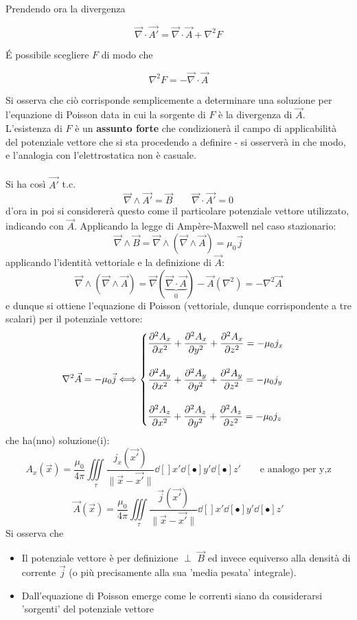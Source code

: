 Prendendo ora la divergenza

\[\vec{\nabla} \cdot \vec{A'} = \vec{\nabla} \cdot \vec{A} + \nabla^2 F\]

\'E possibile scegliere $F$ di modo che

\[\nabla^2 F = - \vec{\nabla} \cdot \vec{A}\]

Si osserva che ciò corrisponde semplicemente a determinare una soluzione per l'equazione di Poisson data in cui la sorgente di $F$ è la divergenza di $\vec{A}$. L'esistenza di $F$ è un \textbf{assunto forte} che condizionerà il campo di applicabilità del potenziale vettore che si sta procedendo a definire - si osserverà in che modo, e l'analogia con l'elettrostatica non è casuale.
\\~\\Si ha così $\vec{A'}$ t.c.
\[\vec{\nabla} \wedge \vec{A'} = \vec{B} \qquad  \vec{\nabla} \cdot \vec{A'} = 0\]
d'ora in poi si considererà questo come il particolare potenziale vettore utilizzato, indicando con $\vec{A}$. Applicando la legge di Ampère-Maxwell nel caso stazionario:
\[\vec{\nabla} \wedge \vec{B} = \vec{\nabla} \wedge (\vec{\nabla} \wedge \vec{A}) = \mu_0 \vec{j}\]
applicando l'identità vettoriale e la definizione di $\vec{A}$:
\[\vec{\nabla} \wedge (\vec{\nabla} \wedge \vec{A}) = \vec{\nabla} (\underbrace{\vec{\nabla} \cdot \vec{A}}_{0}) - \vec{A}(\nabla^2) = - \nabla^2 \vec{A}\]
e dunque si ottiene l'equazione di Poisson (vettoriale, dunque corrispondente a tre scalari) per il potenziale vettore:
\[\nabla^2 \vec{A} = - \mu_0 \vec{j} \Longleftrightarrow \begin{cases}
\displaystyle \pdv[2]{A_x}{x} + \pdv[2]{A_x}{y} + \pdv[2]{A_x}{z} = - \mu_0 j_x \\
\\
\displaystyle \pdv[2]{A_y}{x} + \pdv[2]{A_y}{y} + \pdv[2]{A_y}{z} = - \mu_0 j_y \\
\\
\displaystyle \pdv[2]{A_z}{x} + \pdv[2]{A_z}{y} + \pdv[2]{A_z}{z} = - \mu_0 j_z \\
\end{cases}\]
che ha(nno) soluzione(i):
\[A_x(\vec{x}) = \frac{\mu_0}{4 \pi} \iiint\limits_\tau \frac{j_x(\vec{x'})}{\| \vec{x} - \vec{x'} \|} \dd[]{x'} \dd[•]{y'} \dd[•]{z'} \qquad \textrm{e analogo per y,z}\]
\[\vec{A}(\vec{x}) = \frac{\mu_0}{4 \pi} \iiint\limits_\tau \frac{\vec{j}(\vec{x'})}{\| \vec{x} - \vec{x'} \|} \dd[]{x'} \dd[•]{y'} \dd[•]{z'}\]
Si osserva che
\begin{itemize}
\item Il potenziale vettore è per definizione $\perp$ $\vec{B}$ ed invece equiverso alla densità di corrente $\vec{j}$ (o più precisamente alla sua 'media pesata' integrale).
\item Dall'equazione di Poisson emerge come le correnti siano da considerarsi 'sorgenti' del potenziale vettore
\end{itemize}

